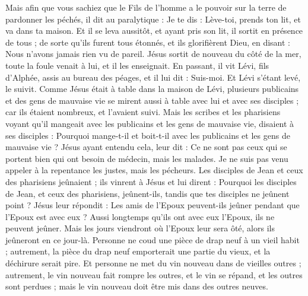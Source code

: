 \begin{multicols}{2}
Mais afin que vous sachiez que le Fils de l'homme a le pouvoir sur la terre de pardonner les péchés, il dit au paralytique :
Je te dis : Lève-toi, prends ton lit, et va dans ta maison.
Et il se leva aussitôt, et ayant pris son lit, il sortit en présence de tous ; de sorte qu'ils furent tous étonnés, et ils glorifièrent Dieu, en disant : Nous n’avons jamais rien vu de pareil.
Jésus sortit de nouveau du côté de la mer, toute la foule venait à lui, et il les enseignait.
En passant, il vit Lévi, fils d'Alphée, assis au bureau des péages, et il lui dit : Suis-moi. Et Lévi s'étant levé, le suivit.
Comme Jésus était à table dans la maison de Lévi, plusieurs publicains et des gens de mauvaise vie se mirent aussi à table avec lui et avec ses disciples ; car ils étaient nombreux, et l'avaient suivi.
Mais les scribes et les pharisiens voyant qu'il mangeait avec les publicains et les gens de mauvaise vie, disaient à ses disciples : Pourquoi mange-t-il et boit-t-il avec les publicains et les gens de mauvaise vie ?
Jésus ayant entendu cela, leur dit : Ce ne sont pas ceux qui se portent bien qui ont besoin de médecin, mais les malades. Je ne suis pas venu appeler à la repentance les justes, mais les pécheurs.
Les disciples de Jean et ceux des pharisiens jeûnaient ; ils vinrent à Jésus et lui dirent : Pourquoi les disciples de Jean, et ceux des pharisiens, jeûnent-ils, tandis que tes disciples ne jeûnent point ?
Jésus leur répondit : Les amis de l'Epoux peuvent-ils jeûner pendant que l'Epoux est avec eux ? Aussi longtemps qu’ils ont avec eux l'Epoux, ils ne peuvent jeûner.
Mais les jours viendront où l'Epoux leur sera ôté, alors ils jeûneront en ce jour-là.
Personne ne coud une pièce de drap neuf à un vieil habit ; autrement, la pièce du drap neuf emporterait une partie du vieux, et la déchirure serait pire.
Et personne ne met du vin nouveau dans de vieilles outres ; autrement, le vin nouveau fait rompre les outres, et le vin se répand, et les outres sont perdues ; mais le vin nouveau doit être mis dans des outres neuves.
\end{multicols}
